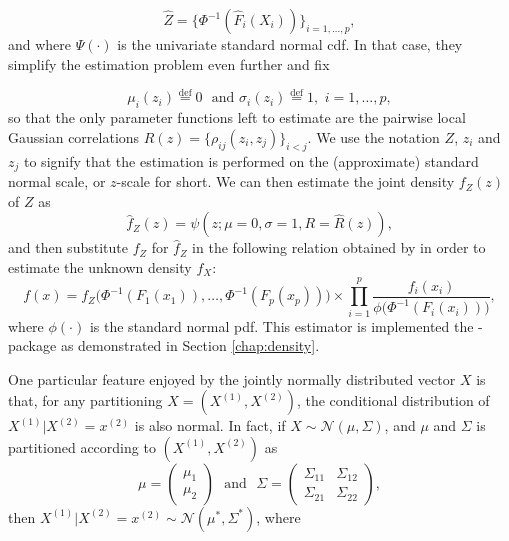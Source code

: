 \begin{equation}
\widehat Z = \{\Phi^{-1}(\widehat F_i(X_i))\}_{i=1,\ldots,p}, 
\label{eq:trans}
\end{equation}
and where $\Psi(\cdot)$ is the univariate standard normal cdf. In that case, they simplify the estimation problem even further and fix

\begin{equation}
\mu_i(z_i) \stackrel{\textrm{def}}{=} 0 \,\, \textrm{ and } \sigma_i(z_i) \stackrel{\textrm{def}}{=} 1, \,\, i = 1,\ldots,p,
\label{eq:simp}
\end{equation}
so that the only parameter functions left to estimate are the pairwise local Gaussian correlations $R(z) = \{\rho_{ij}(z_i, z_j)\}_{i<j}$. We use the notation $Z$, $z_i$ and $z_j$ to signify that the estimation is performed on the (approximate) standard normal scale, or $z$-scale for short. We can then estimate the joint density $f_Z(z)$ of $Z$ as
\begin{equation}
\widehat f_Z(z) = \psi(z; \mu = 0, \sigma = 1, R = \widehat R(z)),
\label{eq:transformed-density}
\end{equation}
and then substitute $f_Z$ for $\widehat f_Z$ in the following relation obtained by \citet{otne:tjos:2017} in order to estimate the unknown density $f_X$:
\begin{equation}
f(x) = f_{Z}\big(\Phi^{-1}(F_1(x_1)), \ldots, \Phi^{-1}(F_p(x_p))\big) \times \prod_{i=1}^p \frac{f_i(x_i)}{\phi\big(\Phi^{-1}(F_i(x_i))\big)},
\label{eq:backtrans}
\end{equation}
where $\phi(\cdot)$ is the standard normal pdf. This estimator is implemented the -package as demonstrated in Section \ref{chap:density}.

One particular feature enjoyed by the jointly normally distributed vector $X$ is that, for any partitioning $X = \left(X^{(1)}, X^{(2)}\right)$, the conditional distribution of $X^{(1)}|X^{(2)} = x^{(2)}$ is also normal. In fact, if $X \sim \mathcal{N}(\mu,\Sigma)$, and $\mu$ and $\Sigma$ is partitioned according to $\left(X^{(1)}, X^{(2)}\right)$ as
$$\mu = \begin{pmatrix} \mu_1 \\\mu_2 \end{pmatrix} \,\, \textrm{ and } \,\, \Sigma = \begin{pmatrix} \Sigma_{11} & \Sigma_{12} \\ \Sigma_{21} & \Sigma_{22} \end{pmatrix},$$
then $X^{(1)}|X^{(2)} = x^{(2)} \sim \mathcal{N}(\mu^*, \Sigma^*)$, where

